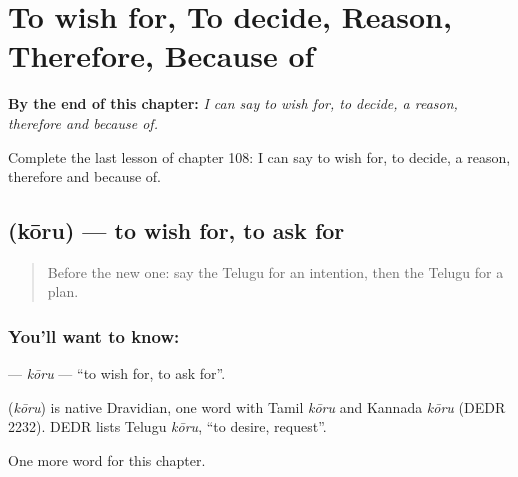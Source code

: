 
\chapter{To wish for, To decide, Reason, Therefore, Because of}
\label{ch:te-to-wish-for-to-decide-reason-therefore-because-of}

\begin{chapteropening}
\textbf{By the end of this chapter:} \emph{I can say to wish for, to decide, a reason, therefore and because of.}

Complete the last lesson of chapter 108: I can say to wish for, to decide, a reason, therefore and because of.
\end{chapteropening}

\section[\texorpdfstring{\te{కోరు} (kōru)}{కోరు (kōru)}]{ (kōru) — to wish for, to ask for}

\label{lesson:TE-C108-koru}



\begin{quote}
Before the new one: say the Telugu for an intention, then the Telugu for a plan.
\end{quote}

\subsection*{You'll want to know: }
\textbf{} — \emph{kōru} — \textquotedblleft{}to wish for, to ask for\textquotedblright{}.

\begin{cousinweb}
\textbf{} (\emph{kōru}) is native Dravidian, one word with Tamil \emph{kōru} and Kannada \emph{kōru} (DEDR 2232). DEDR lists Telugu \emph{kōru}, \textquotedblleft{}to desire, request\textquotedblright{}.
\end{cousinweb}

\begin{grammarlens}[title={What you've built}]
One more word for this chapter.
\end{grammarlens}

